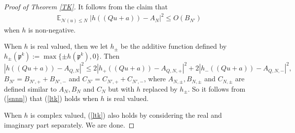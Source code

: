 \documentclass[11pt]{amsart}
\theoremstyle{definition}
\DeclareMathOperator*{\E}{\mathbb{E}}
\newcommand{\NN}{{\mathcal N}}
\newcommand{\mf}{\mathfrak}
\begin{document}
\begin{proof}[Proof of Theorem \ref{TK}]
It follows from the claim that
\begin{equation}\label{ltk3}
    \begin{split}
       \E_{\NN(u) \leq N}\left| h((Qu+a))-A_{N}\right|^{2}
       \leq %
       O(B_{N'})
    \end{split}
\end{equation}
when $h$ is non-negative.

\fi

When $h$ is real valued, then we let $h_{\pm}$ be the additive function defined by $h_{\pm}(\mf p^{k}):=\max\{\pm h(\mf p^{k}),0\}$. Then 
$$\left| h((Qu+a))-A_{Q,N}\right|^{2}\leq 2\left| h_{+}((Qu+a))-A_{Q,N,+}\right|^{2}+2\left| h_{-}((Qu+a))-A_{Q,N,-}\right|^{2},$$
$B_{N'}=B_{N',+}+B_{N',-}$ and $C_{N'}=C_{N',+}+C_{N',-}$, where $A_{N,\pm}, B_{N,\pm}$ and $C_{N,\pm}$ are defined similar to $A_{N}, B_{N}$ and $C_{N}$ but with $h$ replaced by $h_{\pm}$. So it follows from (\ref{snnn}) that (\ref{ltk}) holds when  $h$ is real valued.

When $h$ is complex valued, (\ref{ltk}) also holds by considering the real and imaginary part separately. We are done.
\end{proof}



\iffalse
\end{document}
